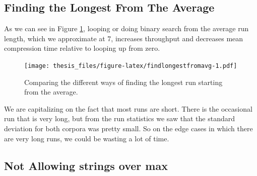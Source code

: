 \documentclass[12pt,twoside]{reedthesis}
\begin{document}
\hypertarget{finding-the-longest-from-the-average}{%
\subsection{Finding the Longest From The Average}\label{finding-the-longest-from-the-average}}

As we can see in Figure \ref{fig:findlongestfromavg}, looping or doing binary search from the average run length, which we approximate at 7, increases throughput and decreases mean compression time relative to looping up from zero.
\begin{figure}
\centering
\texttt{[image: thesis\_files/figure-latex/findlongestfromavg-1.pdf]}
\caption{\label{fig:findlongestfromavg}Comparing the different ways of finding the longest run starting from the average.}
\end{figure}
We are capitalizing on the fact that most runs are short. There is the occasional run that is very long, but from the run statistics we saw that the standard deviation for both corpora was pretty small. So on the edge cases in which there are very long runs, we could be wasting a lot of time.

\hypertarget{not-allowing-strings-over-max}{%
\subsection{Not Allowing strings over max}\label{not-allowing-strings-over-max}}
\end{document}
